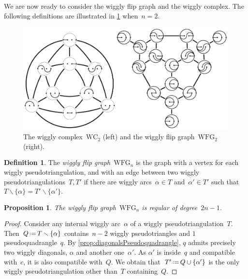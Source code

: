 \documentclass{amsart}
\newtheorem{proposition}[theorem]{Proposition}
\theoremstyle{definition}
\newtheorem{definition}[theorem]{Definition}
\newcommand{\ssm}{\smallsetminus} %
\newcommand{\eqdef}{\mbox{\,\raisebox{0.2ex}{\scriptsize\ensuremath{\mathrm:}}\ensuremath{=}\,}} %
\newcommand{\darkblue}{\color{darkblue}} %
\newcommand{\defn}[1]{\textsl{\darkblue #1}} %
\newcommand{\vincent}[1]{\todo[color=blue!30]{\rm #1 \\ \hfill --- V.}}
\newcommand{\wigglyComplex}{\mathrm{WC}} %
\newcommand{\wigglyFlipGraph}{\mathrm{WFG}} %
\begin{document}

We are now ready to consider the wiggly flip graph and the wiggly complex.
The following definitions are illustrated in \cref{fig:wigglyComplex} when~$n = 2$.
%
\begin{figure}
\centerline{\includegraphics[scale=1.1]{wigglyComplex}}
\caption{The wiggly complex~$\wigglyComplex_2$ (left) and the wiggly flip graph~$\wigglyFlipGraph_2$ (right).}
\label{fig:wigglyComplex}
\end{figure}

\begin{definition}
\label{def:wigglyFlipGraph}
The \defn{wiggly flip graph}~$\wigglyFlipGraph_n$ is the graph with a vertex for each wiggly pseudotriangulation, and with an edge between two wiggly pseudotriangulations~$T,T'$ if there are wiggly arcs~$\alpha \in T$ and~$\alpha' \in T'$ such that~$T \ssm \{\alpha\} = T' \ssm \{\alpha'\}$.
\end{definition}

\begin{proposition}
\label{prop:wigglyFlipGraph}
The wiggly flip graph~$\wigglyFlipGraph_n$ is regular of degree~$2n-1$.
\end{proposition}

\begin{proof}
Consider any internal wiggly arc~$\alpha$ of a wiggly pseudotriangulation~$T$.
Then~$Q \eqdef T \ssm \{\alpha\}$ contains~$n-2$ wiggly pseudotriangles and $1$ pseudoquadrangle~$q$.
By \cref{prop:diagonalsPseudoquadrangle}, $q$ admits precisely two wiggly diagonals, $\alpha$ and another one~$\alpha'$.
As $\alpha'$ is inside~$q$ and compatible with~$c$, it is also compatible with~$Q$.
We obtain that~$T' \eqdef Q \cup \{\alpha'\}$ is the only wiggly pseudotriangulation other than~$T$ containing~$Q$.
\end{proof}
\end{document}
